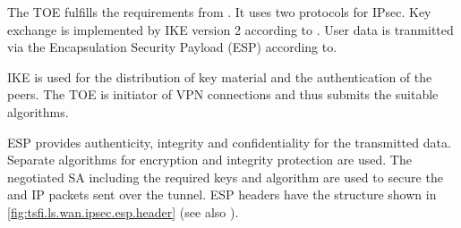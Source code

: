 The TOE fulfills the requirements from . It uses two protocols for
IPsec. Key exchange is implemented by IKE version 2 according to
. User data is tranmitted via the Encapsulation Security Payload
(ESP) according to. 





IKE is used for the distribution of key material and the authentication of the
peers. The TOE is initiator of VPN connections and thus submits the suitable algorithms.



ESP provides authenticity, integrity and confidentiality for the transmitted
data. Separate algorithms for encryption and integrity protection are used. The
negotiated SA including the required keys and algorithm are used to secure the
and IP packets sent over the tunnel. ESP headers have the structure shown in
\autoref{fig:tsfi.ls.wan.ipsec.esp.header} (see also
\cite[Figure~2]{rfc4303}).


